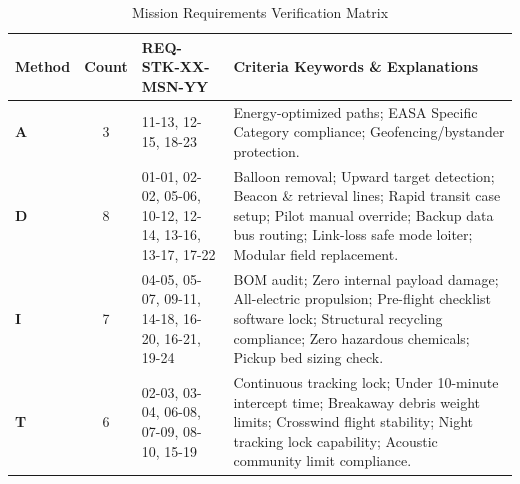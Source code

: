 \begin{table}[H]
\centering
\footnotesize
\caption{Mission Requirements Verification Matrix}
\label{tab:mission_vcrm_consolidated}
\renewcommand{\arraystretch}{1.1}
\setlength{\tabcolsep}{4pt}
\begin{tabularx}{\textwidth}{@{}l c p{} X}
\toprule
\textbf{Method} & \textbf{Count} & \textbf{REQ-STK-XX-MSN-YY} & \textbf{Criteria Keywords \& Explanations} \\
\midrule
\textbf{A}  & 3 & 11-13, 12-15, 18-23 & 
Energy-optimized paths; EASA Specific Category compliance; Geofencing/bystander protection. \\
\midrule
\textbf{D}  & 8 & 01-01, 02-02, 05-06, 10-12, 12-14, 13-16, 13-17, 17-22 & 
Balloon removal; Upward target detection; Beacon \& retrieval lines; Rapid transit case setup; Pilot manual override; Backup data bus routing; Link-loss safe mode loiter; Modular field replacement. \\
\midrule
\textbf{I} & 7 & 04-05, 05-07, 09-11, 14-18, 16-20, 16-21, 19-24 & 
BOM audit; Zero internal payload damage; All-electric propulsion; Pre-flight checklist software lock; Structural recycling compliance; Zero hazardous chemicals; Pickup bed sizing check. \\
\midrule
\textbf{T} & 6 & 02-03, 03-04, 06-08, 07-09, 08-10, 15-19 & 
Continuous tracking lock; Under 10-minute intercept time; Breakaway debris weight limits; Crosswind flight stability; Night tracking lock capability; Acoustic community limit compliance. \\
\bottomrule
\end{tabularx}
\end{table}




